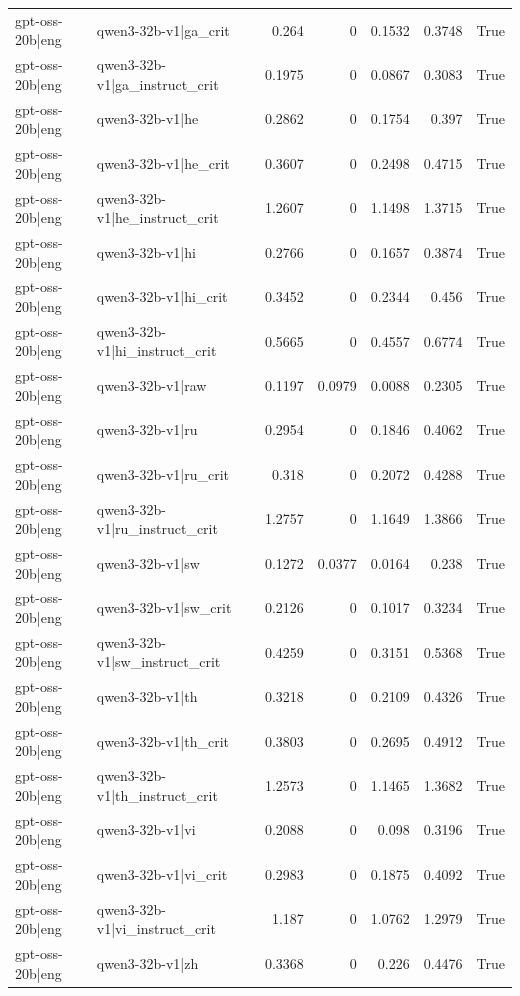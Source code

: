 \begin{table}
\begin{tabular}{l l r r r r l}
gpt-oss-20b|eng & qwen3-32b-v1|ga_crit & 0.264 & 0 & 0.1532 & 0.3748 & True \\
gpt-oss-20b|eng & qwen3-32b-v1|ga_instruct_crit & 0.1975 & 0 & 0.0867 & 0.3083 & True \\
gpt-oss-20b|eng & qwen3-32b-v1|he & 0.2862 & 0 & 0.1754 & 0.397 & True \\
gpt-oss-20b|eng & qwen3-32b-v1|he_crit & 0.3607 & 0 & 0.2498 & 0.4715 & True \\
gpt-oss-20b|eng & qwen3-32b-v1|he_instruct_crit & 1.2607 & 0 & 1.1498 & 1.3715 & True \\
gpt-oss-20b|eng & qwen3-32b-v1|hi & 0.2766 & 0 & 0.1657 & 0.3874 & True \\
gpt-oss-20b|eng & qwen3-32b-v1|hi_crit & 0.3452 & 0 & 0.2344 & 0.456 & True \\
gpt-oss-20b|eng & qwen3-32b-v1|hi_instruct_crit & 0.5665 & 0 & 0.4557 & 0.6774 & True \\
gpt-oss-20b|eng & qwen3-32b-v1|raw & 0.1197 & 0.0979 & 0.0088 & 0.2305 & True \\
gpt-oss-20b|eng & qwen3-32b-v1|ru & 0.2954 & 0 & 0.1846 & 0.4062 & True \\
gpt-oss-20b|eng & qwen3-32b-v1|ru_crit & 0.318 & 0 & 0.2072 & 0.4288 & True \\
gpt-oss-20b|eng & qwen3-32b-v1|ru_instruct_crit & 1.2757 & 0 & 1.1649 & 1.3866 & True \\
gpt-oss-20b|eng & qwen3-32b-v1|sw & 0.1272 & 0.0377 & 0.0164 & 0.238 & True \\
gpt-oss-20b|eng & qwen3-32b-v1|sw_crit & 0.2126 & 0 & 0.1017 & 0.3234 & True \\
gpt-oss-20b|eng & qwen3-32b-v1|sw_instruct_crit & 0.4259 & 0 & 0.3151 & 0.5368 & True \\
gpt-oss-20b|eng & qwen3-32b-v1|th & 0.3218 & 0 & 0.2109 & 0.4326 & True \\
gpt-oss-20b|eng & qwen3-32b-v1|th_crit & 0.3803 & 0 & 0.2695 & 0.4912 & True \\
gpt-oss-20b|eng & qwen3-32b-v1|th_instruct_crit & 1.2573 & 0 & 1.1465 & 1.3682 & True \\
gpt-oss-20b|eng & qwen3-32b-v1|vi & 0.2088 & 0 & 0.098 & 0.3196 & True \\
gpt-oss-20b|eng & qwen3-32b-v1|vi_crit & 0.2983 & 0 & 0.1875 & 0.4092 & True \\
gpt-oss-20b|eng & qwen3-32b-v1|vi_instruct_crit & 1.187 & 0 & 1.0762 & 1.2979 & True \\
gpt-oss-20b|eng & qwen3-32b-v1|zh & 0.3368 & 0 & 0.226 & 0.4476 & True \\

\end{tabular}
\end{table}
